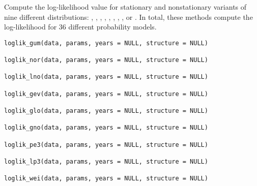 \documentclass[a4paper]{book}
\begin{document}
%
\begin{Description}
Compute the log-likelihood value for stationary and nonstationary variants
of nine different distributions: , , , , ,
, , , or . In total, these methods compute the
log-likelihood for 36 different probability models.
\end{Description}
%
\begin{Usage}
\begin{verbatim}
loglik_gum(data, params, years = NULL, structure = NULL)

loglik_nor(data, params, years = NULL, structure = NULL)

loglik_lno(data, params, years = NULL, structure = NULL)

loglik_gev(data, params, years = NULL, structure = NULL)

loglik_glo(data, params, years = NULL, structure = NULL)

loglik_gno(data, params, years = NULL, structure = NULL)

loglik_pe3(data, params, years = NULL, structure = NULL)

loglik_lp3(data, params, years = NULL, structure = NULL)

loglik_wei(data, params, years = NULL, structure = NULL)
\end{verbatim}
\end{Usage}
%
\end{document}
